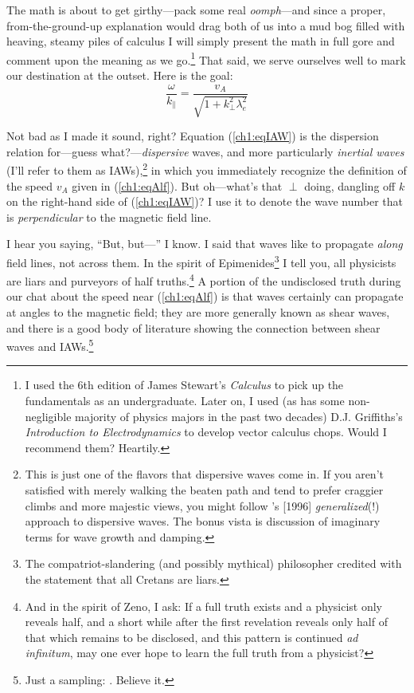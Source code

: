 The math is about to get girthy---pack some real \emph{oomph}---and since a
proper, from-the-ground-up explanation would drag both of us into a mud bog
filled with heaving, steamy piles of calculus I will simply present the math in
full gore and comment upon the meaning as we go.\footnote{I used the 6th edition
  of James Stewart's \textsl{Calculus} to pick up the fundamentals as an
  undergraduate. Later on, I used (as has some non-negligible majority of
  physics majors in the past two decades) D.J. Griffiths's \textsl{Introduction
    to Electrodynamics} to develop vector calculus chops. Would I recommend
  them? Heartily.} That said, we serve ourselves well to mark our destination at
the outset. Here is the goal:
\begin{equation}
  \label{ch1:eqIAW}
  \dfrac{\omega}{k_\parallel} = \dfrac{v_A}{ \sqrt{1 + k_\perp^2 \lambda_e^2 }}
\end{equation}

Not bad as I made it sound, right? Equation (\ref{ch1:eqIAW}) is the dispersion
relation for---guess what?---\emph{dispersive} \Alf waves, and more particularly
\emph{inertial \Alf waves} (I'll refer to them as IAWs),\footnote{This is just
  one of the flavors that dispersive \Alf waves come in. If you aren't satisfied
  with merely walking the beaten path and tend to prefer craggier climbs and
  more majestic views, you might follow \citeauthor{Lysak1996}'s [1996]
  \emph{generalized}(!) approach to dispersive \Alf waves. The bonus vista is
  discussion of imaginary terms for wave growth and damping.} in which you
immediately recognize the definition of the \Alf speed $v_A$ given in
(\ref{ch1:eqAlf}).  But oh---what's that $\perp$ doing, dangling off $k$ on the
right-hand side of (\ref{ch1:eqIAW})?  I use it to denote the wave number that
is \emph{perpendicular} to the magnetic field line.

I hear you saying, ``But, but---'' I know. I said that \Alf waves like to
propagate \emph{along} field lines, not across them. In the spirit of
Epimenides\footnote{The compatriot-slandering (and possibly mythical)
  philosopher credited with the statement that all Cretans are liars.} I tell
you, all physicists are liars and purveyors of half truths.\footnote{And in the
  spirit of Zeno, I ask: If a full truth exists and a physicist only reveals
  half, and a short while after the first revelation reveals only half of that
  which remains to be disclosed, and this pattern is continued \textit{ad
    infinitum}, may one ever hope to learn the full truth from a physicist?} A
portion of the undisclosed truth during our chat about the \Alf speed near
(\ref{ch1:eqAlf}) is that \Alf waves certainly can propagate at angles to the
magnetic field; they are more generally known as shear \Alf waves, and there is
a good body of literature showing the connection between shear \Alf waves and
IAWs.\footnote{Just a sampling:
  \citet{Heyvaerts1983,Lysak1996,Rankin1999,Drozdenko2000,Vincena2004,Tsiklauri2005,Chaston2007d,Watt2009}. Believe
  it.}

